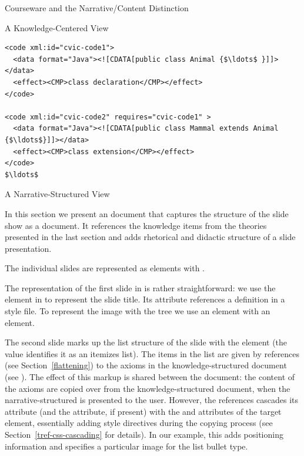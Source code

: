 \begin{tchapter}[id=courseware]{Courseware and the Narrative/Content Distinction}
\begin{tsection}[id=knowledge-centered]{A Knowledge-Centered View}
\begin{lstlisting}[label=lst:cvi-code,mathescape,
    caption={{\omdoc} Representation of Program Code},
    index={code,data,CDATA,effect}]
<code xml:id="cvic-code1">
  <data format="Java"><![CDATA[public class Animal {$\ldots$ }]]></data>
  <effect><CMP>class declaration</CMP></effect>
</code>

<code xml:id="cvic-code2" requires="cvic-code1" >
  <data format="Java"><![CDATA[public class Mammal extends Animal {$\ldots$}]]></data>
  <effect><CMP>class extension</CMP></effect>
</code>
$\ldots$
\end{lstlisting}
\end{tsection}

\begin{tsection}[id=narrative-structured]{A Narrative-Structured View}

In this section we present an {\omdoc} document that captures the structure of the
slide show as a document. It references the knowledge items from the theories
presented in the last section and adds rhetorical and didactic structure of a
slide presentation.

The individual slides are represented as {} elements with
{} {}.

The representation of the first slide in {} is rather straightforward: we
use the {} element in {} to represent the slide title.
Its {} attribute references a {\css} {}
definition in a style file. To represent the image with the
{} tree we use an {} element with an {}
element.

The second slide marks up the list structure of the slide with the {}
element (the value {} identifies it as an itemizes
list). The items in the list are given by {\omdoc} references (see Section~\ref{flattening}) to
the axioms in the knowledge-structured document (see {}). The effect of
this markup is shared between the document: the content of the axioms are copied over from
the knowledge-structured document, when the narrative-structured is presented to the
user. However, the {\omdoc} references cascades its {} attribute
(and the {} attribute, if present) with the {}
and {} attributes of the target element, essentially adding style
directives during the copying process (see Section~\ref{tref-css-cascading} for details). In our
example, this adds positioning information and specifies a particular image for the list
bullet type.


\end{tsection}
\end{tchapter}
